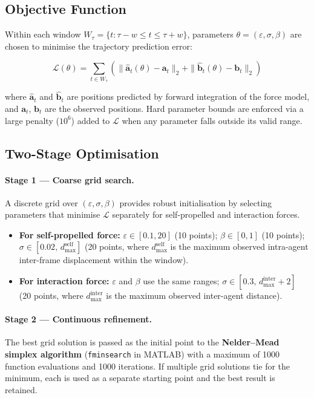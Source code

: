 \documentclass[11pt,a4paper]{article}
\begin{document}
\subsection{Objective Function}

Within each window $W_\tau = \{t : \tau - w \leq t \leq \tau + w\}$, parameters $\theta = (\varepsilon, \sigma, \beta)$ are chosen to minimise the trajectory prediction error:

\begin{equation}
    \mathcal{L}(\theta) = \sum_{t \in W_\tau} \left( \|\hat{\mathbf{a}}_t(\theta) - \mathbf{a}_t\|_2 + \|\hat{\mathbf{b}}_t(\theta) - \mathbf{b}_t\|_2 \right)
\end{equation}

\noindent where $\hat{\mathbf{a}}_t$ and $\hat{\mathbf{b}}_t$ are positions predicted by forward integration of the force model, and $\mathbf{a}_t$, $\mathbf{b}_t$ are the observed positions. Hard parameter bounds are enforced via a large penalty ($10^6$) added to $\mathcal{L}$ when any parameter falls outside its valid range.

\subsection{Two-Stage Optimisation}

\paragraph{Stage 1 --- Coarse grid search.} A discrete grid over $(\varepsilon, \sigma, \beta)$ provides robust initialisation by selecting parameters that minimise $\mathcal{L}$ separately for self-propelled and interaction forces.

\begin{itemize}
    \item \textbf{For self-propelled force:} $\varepsilon \in [0.1, 20]$ (10 points); $\beta \in [0, 1]$ (10 points); $\sigma \in [0.02,\, d_{\max}^{\text{self}}]$ (20 points, where $d_{\max}^{\text{self}}$ is the maximum observed intra-agent inter-frame displacement within the window).
    \item \textbf{For interaction force:} $\varepsilon$ and $\beta$ use the same ranges; $\sigma \in [0.3,\, d_{\max}^{\text{inter}} + 2]$ (20 points, where $d_{\max}^{\text{inter}}$ is the maximum observed inter-agent distance).
\end{itemize}

\paragraph{Stage 2 --- Continuous refinement.} The best grid solution is passed as the initial point to the \textbf{Nelder--Mead simplex algorithm} (\texttt{fminsearch} in MATLAB) with a maximum of 1000 function evaluations and 1000 iterations. If multiple grid solutions tie for the minimum, each is used as a separate starting point and the best result is retained.
\end{document}
